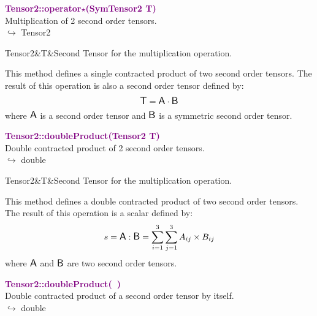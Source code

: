 \textcolor{purple}{\textbf{Tensor2::operator$\star$(SymTensor2 T)}}\label{Tensor2::operator*(SymTensor2 T)}\\
Multiplication of 2 second order tensors.\\ \hspace*{10mm}$\hookrightarrow$ Tensor2

\begin{tcolorbox}[width=\textwidth,myArgs,tabularx={ll|R}]
Tensor2&T&Second Tensor for the multiplication operation.
\end{tcolorbox}

This method defines a single contracted product of two second order tensors.
The result of this operation is also a second order tensor defined by:
\begin{equation*}
\mbox{\large\ensuremath{\mathsf{T}}} = \mbox{\large\ensuremath{\mathsf{A}}} \cdot \mbox{\large\ensuremath{\mathsf{B}}}
\end{equation*}
where $\mbox{\large\ensuremath{\mathsf{A}}}$ is a second order tensor and $\mbox{\large\ensuremath{\mathsf{B}}}$ is a symmetric second order tensor.

\textcolor{purple}{\textbf{Tensor2::doubleProduct(Tensor2 T)}}\label{Tensor2::doubleProduct(Tensor2 T)}\\
Double contracted product of 2 second order tensors.\\ \hspace*{10mm}$\hookrightarrow$ double

\begin{tcolorbox}[width=\textwidth,myArgs,tabularx={ll|R}]
Tensor2&T&Second Tensor for the multiplication operation.
\end{tcolorbox}

This method defines a double contracted product of two second order tensors.
The result of this operation is a scalar defined by:
\begin{equation*}
s = \mbox{\large\ensuremath{\mathsf{A}}} : \mbox{\large\ensuremath{\mathsf{B}}} = \sum_{i=1}^{3} \sum_{j=1}^{3} A_{ij}\times B_{ij}
\end{equation*}
where $\mbox{\large\ensuremath{\mathsf{A}}}$ and $\mbox{\large\ensuremath{\mathsf{B}}}$ are two second order tensors.

\textcolor{purple}{\textbf{Tensor2::doubleProduct(~)}}\label{Tensor2::doubleProduct()}\\
Double contracted product of a second order tensor by itself.\\ \hspace*{10mm}$\hookrightarrow$ double

